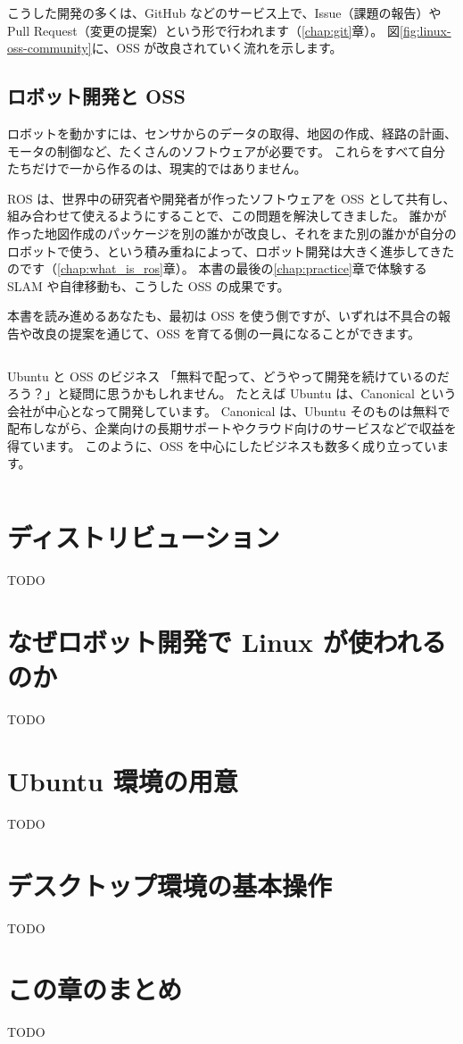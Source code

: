 こうした開発の多くは、GitHub などのサービス上で、Issue（課題の報告）や Pull Request（変更の提案）という形で行われます（\ref{chap:git}章）。
図\ref{fig:linux-oss-community}に、OSS が改良されていく流れを示します。

\subsection{ロボット開発と OSS}

ロボットを動かすには、センサからのデータの取得、地図の作成、経路の計画、モータの制御など、たくさんのソフトウェアが必要です。
これらをすべて自分たちだけで一から作るのは、現実的ではありません。

ROS は、世界中の研究者や開発者が作ったソフトウェアを OSS として共有し、組み合わせて使えるようにすることで、この問題を解決してきました。
誰かが作った地図作成のパッケージを別の誰かが改良し、それをまた別の誰かが自分のロボットで使う、という積み重ねによって、ロボット開発は大きく進歩してきたのです（\ref{chap:what_is_ros}章）。
本書の最後の\ref{chap:practice}章で体験する SLAM や自律移動も、こうした OSS の成果です。

本書を読み進めるあなたも、最初は OSS を使う側ですが、いずれは不具合の報告や改良の提案を通じて、OSS を育てる側の一員になることができます。

\begin{column}{Ubuntu と OSS のビジネス}
  「無料で配って、どうやって開発を続けているのだろう？」と疑問に思うかもしれません。
  たとえば Ubuntu は、Canonical という会社が中心となって開発しています。
  Canonical は、Ubuntu そのものは無料で配布しながら、企業向けの長期サポートやクラウド向けのサービスなどで収益を得ています。
  このように、OSS を中心にしたビジネスも数多く成り立っています。
\end{column}

\section{ディストリビューション}

TODO

\section{なぜロボット開発で Linux が使われるのか}

TODO

\section{Ubuntu 環境の用意}

TODO

\section{デスクトップ環境の基本操作}

TODO

\section*{この章のまとめ}

TODO
